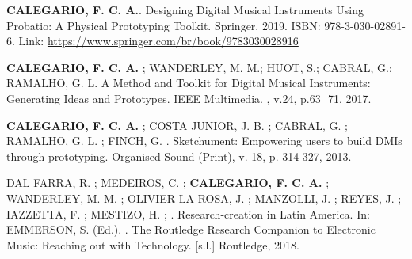 

\begin{cvparagraph}
\textbf{CALEGARIO, F. C. A.}. Designing Digital Musical Instruments Using Probatio: A Physical Prototyping Toolkit. Springer. 2019. ISBN: 978-3-030-02891-6. Link: \href{https://www.springer.com/br/book/9783030028916}{https://www.springer.com/br/book/9783030028916}
\end{cvparagraph}


\begin{cvparagraph}
\textbf{CALEGARIO, F. C. A.} ; WANDERLEY, M. M.; HUOT, S.; CABRAL, G.; RAMALHO, G. L. A Method and Toolkit for Digital Musical Instruments: Generating Ideas and Prototypes. IEEE Multimedia. , v.24, p.63 ­ 71, 2017.
\end{cvparagraph}
\begin{cvparagraph}
\textbf{CALEGARIO, F. C. A.} ; COSTA JUNIOR, J. B. ; CABRAL, G. ; RAMALHO, G. L. ; FINCH, G. . Sketchument: Empowering users to build DMIs through prototyping. Organised Sound (Print), v. 18, p. 314­-327, 2013.
\end{cvparagraph}
\pagebreak

\begin{cvparagraph}
DAL FARRA, R. ; MEDEIROS, C. ; \textbf{CALEGARIO, F. C. A.} ; WANDERLEY, M. M. ; OLIVIER LA ROSA, J. ; MANZOLLI, J. ; REYES, J. ; IAZZETTA, F. ; MESTIZO, H. ; . Research-creation in Latin America. In: EMMERSON, S. (Ed.). . The Routledge Research Companion to Electronic Music: Reaching out with Technology. [s.l.] Routledge, 2018. 
\end{cvparagraph}

